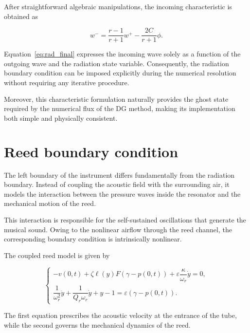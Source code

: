 \documentclass[11pt,a4paper]{report}
\theoremstyle{plain}
\theoremstyle{definition}
\begin{document}
After straightforward algebraic manipulations, the incoming characteristic is
obtained as

\begin{equation}
\boxed{
w^-
=
\dfrac{r-1}{r+1}w^+
-
\dfrac{2C}{r+1}\phi.
}
\label{eq:rad_final}
\end{equation}

Equation~\eqref{eq:rad_final} expresses the incoming wave solely as a function
of the outgoing wave and the radiation state variable.
Consequently, the radiation boundary condition can be imposed explicitly during
the numerical resolution without requiring any iterative procedure.

Moreover, this characteristic formulation naturally provides the ghost state
required by the numerical flux of the DG method, making its implementation both
simple and physically consistent.


\section{Reed boundary condition}

The left boundary of the instrument differs fundamentally from the radiation
boundary. Instead of coupling the acoustic field with the surrounding air, it
models the interaction between the pressure waves inside the resonator and the
mechanical motion of the reed.

This interaction is responsible for the self-sustained oscillations that
generate the musical sound. Owing to the nonlinear airflow through the reed
channel, the corresponding boundary condition is intrinsically nonlinear.

The coupled reed model is given by

\begin{equation}
\begin{cases}
-v(0,t)
+
\zeta\ell(y)
F(\gamma-p(0,t))
+
\varepsilon\dfrac{\kappa}{\omega_r}\dot y
=
0,
\\[0.5em]
\dfrac{1}{\omega_r^2}\ddot y
+
\dfrac{1}{Q_r\omega_r}\dot y
+
y-1
=
\varepsilon(\gamma-p(0,t)).
\end{cases}
\label{eq:reed_original}
\end{equation}

The first equation prescribes the acoustic velocity at the entrance of the tube,
while the second governs the mechanical dynamics of the reed.
\end{document}
